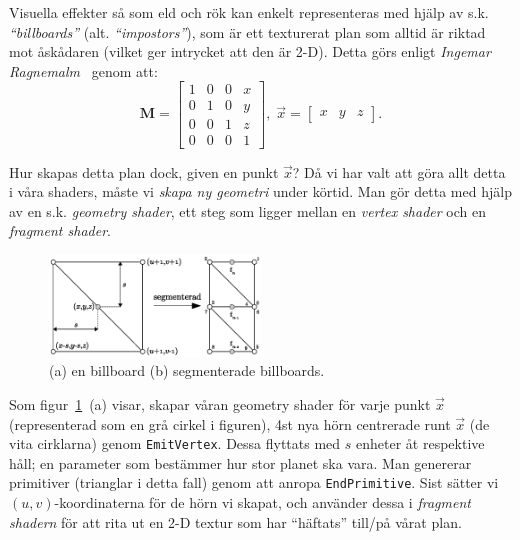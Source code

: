 \documentclass[a4paper]{article}
\begin{document}
\begin{multicols}{2}
Visuella effekter så som eld och rök kan enkelt representeras med hjälp av s.k. \emph{``billboards''} (alt. \emph{``impostors''}), som är ett texturerat plan som alltid är riktad mot åskådaren (vilket ger intrycket att den är 2-D). Detta görs enligt \emph{Ingemar Ragnemalm}~\cite{ragnemalm2008polygons} genom att: \[\mathbf{M} = \begin{bmatrix} 1 & 0 & 0 & x \\
                                    0 & 1 & 0 & y \\
                                    0 & 0 & 1 & z \\
                                    0 & 0 & 0 & 1 \end{bmatrix}, \;
          \vec{x} = \begin{bmatrix}x & y & z\end{bmatrix}.\]

Hur skapas detta plan dock, given en punkt \(\vec{x}\)? Då vi har valt att göra allt detta i våra shaders, måste vi \emph{skapa ny geometri} under körtid. Man gör detta med hjälp av en s.k. \emph{geometry shader}, ett steg som ligger mellan en \emph{vertex shader} och en \emph{fragment shader}.

\vspace{-0.3cm}
\begin{figure}[H]
\center
\includegraphics[width=0.5\textwidth]{share/Billboards.eps}
\caption{(a) en billboard (b) segmenterade billboards.}
\label{fig:bill}
\end{figure}
\vspace{-0.3cm}

Som figur~\ref{fig:bill}~(a) visar, skapar våran geometry shader för varje punkt \(\vec{x}\) (representerad som en grå cirkel i figuren), 4st nya hörn centrerade runt \(\vec{x}\) (de vita cirklarna) genom \texttt{EmitVertex}. Dessa flyttats med \(s\) enheter åt respektive håll; en parameter som bestämmer hur stor planet ska vara. Man genererar primitiver (trianglar i detta fall) genom att anropa \texttt{EndPrimitive}. Sist sätter vi \((u, v)\)-koordinaterna för de hörn vi skapat, och använder dessa i \emph{fragment shadern} för att rita ut en 2-D textur som har ``häftats'' till/på vårat plan.


\end{multicols}
\end{document}
